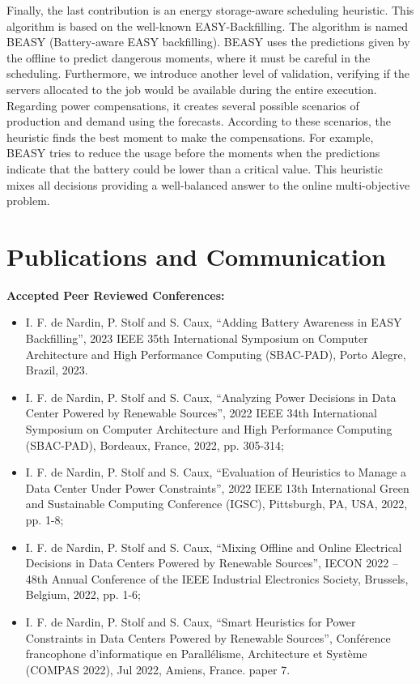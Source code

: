 Finally, the last contribution is an energy storage-aware scheduling heuristic. This algorithm is based on the well-known EASY-Backfilling. The algorithm is named BEASY (Battery-aware EASY backfilling). BEASY uses the predictions given by the offline to predict dangerous moments, where it must be careful in the scheduling. Furthermore, we introduce another level of validation, verifying if the servers allocated to the job would be available during the entire execution. Regarding power compensations, it creates several possible scenarios of production and demand using the forecasts. According to these scenarios, the heuristic finds the best moment to make the compensations. For example, BEASY tries to reduce the usage before the moments when the predictions indicate that the battery could be lower than a critical value. This heuristic mixes all decisions providing a well-balanced answer to the online multi-objective problem.

\section{Publications and Communication}

\hspace{0.5cm} \textbf{Accepted Peer Reviewed Conferences:}
\begin{itemize}
    \item I. F. de Nardin, P. Stolf and S. Caux, ``Adding Battery Awareness in EASY Backfilling'', 2023 IEEE 35th International Symposium on Computer Architecture and High Performance Computing (SBAC-PAD), Porto Alegre, Brazil, 2023.
    \item I. F. de Nardin, P. Stolf and S. Caux, ``Analyzing Power Decisions in Data Center Powered by Renewable Sources'', 2022 IEEE 34th International Symposium on Computer Architecture and High Performance Computing (SBAC-PAD), Bordeaux, France, 2022, pp. 305-314;
    \item I. F. de Nardin, P. Stolf and S. Caux, ``Evaluation of Heuristics to Manage a Data Center Under Power Constraints'', 2022 IEEE 13th International Green and Sustainable Computing Conference (IGSC), Pittsburgh, PA, USA, 2022, pp. 1-8;
    \item I. F. de Nardin, P. Stolf and S. Caux, ``Mixing Offline and Online Electrical Decisions in Data Centers Powered by Renewable Sources'', IECON 2022 – 48th Annual Conference of the IEEE Industrial Electronics Society, Brussels, Belgium, 2022, pp. 1-6;
    \item  I. F. de Nardin, P. Stolf and S. Caux, ``Smart Heuristics for Power Constraints in Data Centers Powered by Renewable Sources'', Conférence francophone d'informatique en Parallélisme, Architecture et Système (COMPAS 2022), Jul 2022, Amiens, France. paper 7.
\end{itemize}


